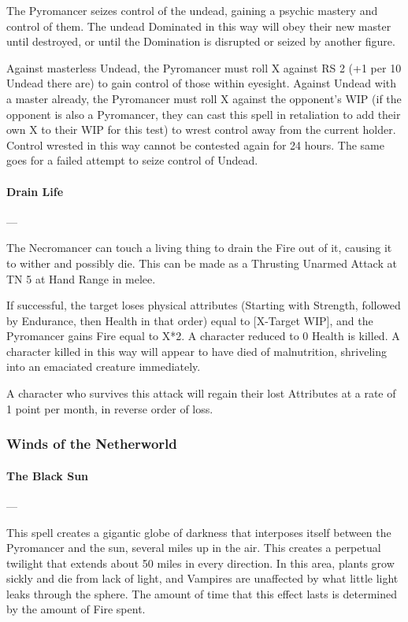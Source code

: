 \documentclass[oneside,11pt,english]{book}
\begin{document}
The Pyromancer seizes control of the undead, gaining a psychic mastery and control of them. 
The undead Dominated in this way will obey their new master until destroyed, or until the 
Domination is disrupted or seized by another figure. 

Against masterless Undead, the Pyromancer must roll X against RS 2 (+1 per 10 Undead there 
are) to gain control of those within eyesight. 
Against Undead with a master already, the Pyromancer must roll X against the opponent’s WIP 
(if the opponent is also a Pyromancer, they can cast this spell in retaliation to add their own X to 
their WIP for this test) to wrest control away from the current holder.
Control wrested in this way 
cannot be contested again for 24 hours. The same goes for a failed attempt to seize control of Undead. 

\paragraph{Drain Life} 
---\quad [X]

The Necromancer can touch a living thing to drain the Fire out of it, causing it to wither and 
possibly die. This can be made as a Thrusting Unarmed Attack at TN 5 at Hand Range in 
melee. 

If successful, the target loses physical attributes (Starting with Strength, followed by Endurance, 
then Health in that order) equal to [X-Target WIP], and the Pyromancer gains Fire equal to X*2. 
A character reduced to 0 Health is killed. A character killed in this way will appear to have died 
of malnutrition, shriveling into an emaciated creature immediately. 

A character who survives this attack will regain their lost Attributes at a rate of 1 point per 
month, in reverse order of loss. 

\subsubsection{Winds of the Netherworld}

\paragraph{The Black Sun}
---\quad [10+X] 

This spell creates a gigantic globe of darkness that interposes itself between the Pyromancer 
and the sun, several miles up in the air. This creates a perpetual twilight that extends about 50 
miles in every direction. In this area, plants grow sickly and die from lack of light, and Vampires 
are unaffected by what little light leaks through the sphere. The amount of time that this effect 
lasts is determined by the amount of Fire spent. 
\end{document}

